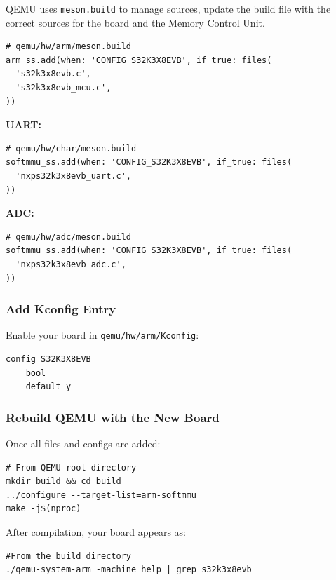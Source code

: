 \documentclass{article}
\begin{document}
QEMU uses \texttt{meson.build} to manage sources, update the build file with the correct sources for the board and the Memory Control Unit.


\begin{verbatim}
# qemu/hw/arm/meson.build
arm_ss.add(when: 'CONFIG_S32K3X8EVB', if_true: files(
  's32k3x8evb.c',
  's32k3x8evb_mcu.c',
))
\end{verbatim}
\newline
\newpage
\textbf{UART:}
\begin{verbatim}
# qemu/hw/char/meson.build
softmmu_ss.add(when: 'CONFIG_S32K3X8EVB', if_true: files(
  'nxps32k3x8evb_uart.c',
))
\end{verbatim}

\textbf{ADC:}


\begin{verbatim}
# qemu/hw/adc/meson.build
softmmu_ss.add(when: 'CONFIG_S32K3X8EVB', if_true: files(
  'nxps32k3x8evb_adc.c',
))
\end{verbatim}



\subsubsection{Add Kconfig Entry}

Enable your board in \texttt{qemu/hw/arm/Kconfig}:
\begin{verbatim}
config S32K3X8EVB
    bool
    default y

\end{verbatim}


\subsubsection{Rebuild QEMU with the New Board}

Once all files and configs are added:
\begin{verbatim}
# From QEMU root directory
mkdir build && cd build
../configure --target-list=arm-softmmu
make -j$(nproc)
\end{verbatim}

After compilation, your board appears as:
\begin{verbatim}
#From the build directory
./qemu-system-arm -machine help | grep s32k3x8evb
\end{verbatim}
\end{document}
